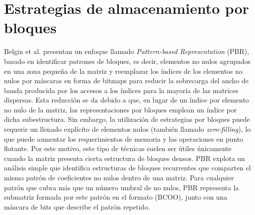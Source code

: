 
\section{Estrategias de almacenamiento por bloques}

Belgin et al. \cite{Belgin2009} presentan un enfoque llamado \textit{Pattern-based Representation} (PBR), basado en identificar patrones de bloques, es decir, elementos no nulos agrupados en una zona pequeña de la matriz y reemplazar los índices de los elementos no nulos por máscaras en forma  de bitmaps para reducir la sobrecarga del ancho de banda producida por los accesos a los índices para la mayoría de las matrices dispersas.
Esta reducción se da debido a que, en lugar de un índice por elemento no nulo de la matriz, las representaciones por bloques emplean un índice por dicha subestructura. Sin embargo, la utilización de estrategias por bloques puede requerir un llenado  explícito de elementos nulos (también llamado \textit{zero-filling}), lo que puede aumentar los requerimientos de memoria y las operaciones en punto flotante. Por este motivo, este tipo de técnicas suelen ser útiles únicamente cuando la matriz presenta cierta estructura de bloques densos.
PBR explota un análisis simple que identifica estructuras de bloques recurrentes que comparten el mismo patrón de coeficientes no nulos dentro de una matriz. Para cualquier patrón que cubra más que un número umbral de no nulos, PBR representa la submatriz formada por este patrón en el formato (BCOO), junto con una máscara de bits que describe el patrón repetido.
